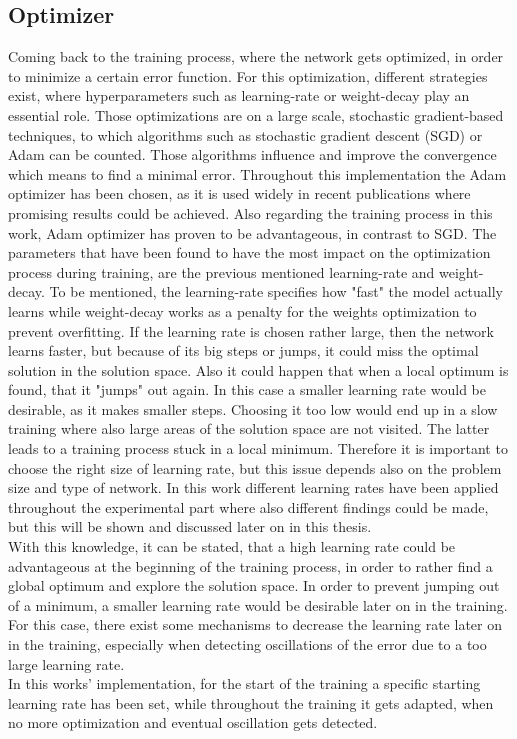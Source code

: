 \subsection{Optimizer}
Coming back to the training process, where the network gets optimized, in order to minimize a certain error function. For this optimization, different strategies exist, where hyperparameters such as learning-rate or weight-decay play an essential role. Those optimizations are on a large scale, stochastic gradient-based techniques, to which algorithms such as stochastic gradient descent (SGD) or Adam can be counted. Those algorithms influence and improve the convergence which means to find a minimal error. Throughout this implementation the Adam optimizer \cite{Kingma2014} has been chosen, as it is used widely in recent publications where promising results could be achieved. Also regarding the training process in this work, Adam optimizer has proven to be advantageous, in contrast to SGD. The parameters that have been found to have the most impact on the optimization process during training, are the previous mentioned learning-rate and weight-decay. To be mentioned, the learning-rate specifies how "fast" the model actually learns while weight-decay works as a penalty for the weights optimization to prevent overfitting. If the learning rate is chosen rather large, then the network learns faster, but because of its big steps or jumps, it could miss the optimal solution in the solution space. Also it could happen that when a local optimum is found, that it "jumps" out again. In this case a smaller learning rate would be desirable, as it makes smaller steps. Choosing it too low would end up in a slow training where also large areas of the solution space are not visited. The latter leads to a training process stuck in a local minimum. Therefore it is important to choose the right size of learning rate, but this issue depends also on the problem size and type of network. In this work different learning rates have been applied throughout the experimental part where also different findings could be made, but this will be shown and discussed later on in this thesis.\\
With this knowledge, it can be stated, that a high learning rate could be advantageous at the beginning of the training process, in order to rather find a global optimum and explore the solution space. In order to prevent jumping out of a minimum, a smaller learning rate would be desirable later on in the training. For this case, there exist some mechanisms to decrease the learning rate later on in the training, especially when detecting oscillations of the error due to a too large learning rate.\\
In this works' implementation, for the start of the training a specific starting learning rate has been set, while throughout the training it gets adapted, when no more optimization and eventual oscillation gets detected. 


